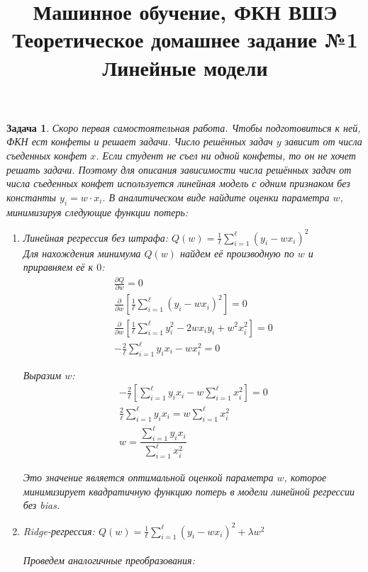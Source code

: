 \documentclass[a4paper,12pt]{article}
\title{Машинное обучение, ФКН ВШЭ \\ Теоретическое домашнее задание №1 \\ Линейные модели}
\author{}
\date{}
\theoremstyle{mystyle}
\newtheorem{esProblem}{Задача}
\begin{document}
\maketitle

\begin{esProblem}
Скоро первая самостоятельная работа. Чтобы подготовиться к ней, ФКН ест конфеты и решает задачи. Число решённых задач $y$ зависит от числа съеденных конфет $x$. Если студент не съел ни одной конфеты, то он не хочет решать задачи. Поэтому для описания зависимости числа решённых задач от числа съеденных конфет используется линейная модель с одним признаком без константы $y_i = w \cdot x_i.$ В аналитическом виде найдите оценки параметра $w$, минимизируя следующие функции потерь:

\begin{enumerate}
    \item Линейная регрессия без штрафа: $Q(w) = \frac{1}{\ell} \sum_{i=1}^{\ell} (y_i - w x_i)^2$\\
    
Для нахождения минимума $Q(w)$ найдем её производную по $w$ и приравняем её к $0$:
\[
\begin{gathered}
    \frac{\partial Q}{\partial w} = 0 \\
    \frac{\partial}{\partial w} \left[\frac{1}{\ell} \sum_{i=1}^{\ell} (y_i - w x_i)^2\right] = 0 \\
    \frac{\partial}{\partial w} \left[\frac{1}{\ell} \sum_{i=1}^{\ell} y_i^2 - 2w x_i y_i + w^2 x_i^2\right] = 0 \\
    -\frac{2}{\ell} \sum_{i=1}^{\ell} y_i x_i  - w x_i^2 = 0
\end{gathered}
\]

Выразим $w$:
\[
\begin{gathered}
    -\frac{2}{\ell}\left[ \sum_{i=1}^{\ell} y_i x_i - w \sum_{i=1}^{\ell} x_i^2\right] = 0 \\
    \frac{2}{\ell} \sum_{i=1}^{\ell} y_i x_i  = w \sum_{i=1}^{\ell} x_i^2 \\
    w = \dfrac{\sum_{i=1}^{\ell} y_i x_i }{\sum_{i=1}^{\ell} x_i^2}
\end{gathered}
\]

Это значение является оптимальной оценкой параметра $w$, которое минимизирует квадратичную функцию потерь в модели линейной регрессии без bias.
    
    
    \item Ridge-регрессия: $Q(w) = \frac{1}{\ell} \sum_{i=1}^{\ell} (y_i - w x_i)^2 + \lambda w^2$ \\\\
    Проведем аналогичные преобразования:
    

\end{enumerate}
\end{esProblem}
\end{document}
